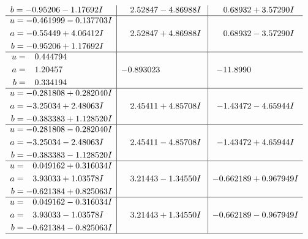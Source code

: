 \documentclass[1p]{elsarticle_modified}
\theoremstyle{definition}
\begin{document}
$$\begin{array}{c|c|c}
\begin{aligned}
b &= -0.95206 - 1.17692 I\end{aligned}
 & \phantom{-}2.52847 - 4.86988 I & \phantom{-}0.68932 + 3.57290 I \\ \hline\begin{aligned}
u &= -0.461999 - 0.137703 I \\
a &= -0.55449 + 4.06412 I \\
b &= -0.95206 + 1.17692 I\end{aligned}
 & \phantom{-}2.52847 + 4.86988 I & \phantom{-}0.68932 - 3.57290 I \\ \hline\begin{aligned}
u &= \phantom{-}0.444794\phantom{ +0.000000I} \\
a &= \phantom{-}1.20457\phantom{ +0.000000I} \\
b &= \phantom{-}0.334194\phantom{ +0.000000I}\end{aligned}
 & -0.893023\phantom{ +0.000000I} & -11.8990\phantom{ +0.000000I} \\ \hline\begin{aligned}
u &= -0.281808 + 0.282040 I \\
a &= -3.25034 + 2.48063 I \\
b &= -0.383383 + 1.128520 I\end{aligned}
 & \phantom{-}2.45411 + 4.85708 I & -1.43472 - 4.65944 I \\ \hline\begin{aligned}
u &= -0.281808 - 0.282040 I \\
a &= -3.25034 - 2.48063 I \\
b &= -0.383383 - 1.128520 I\end{aligned}
 & \phantom{-}2.45411 - 4.85708 I & -1.43472 + 4.65944 I \\ \hline\begin{aligned}
u &= \phantom{-}0.049162 + 0.316034 I \\
a &= \phantom{-}3.93033 + 1.03578 I \\
b &= -0.621384 + 0.825063 I\end{aligned}
 & \phantom{-}3.21443 - 1.34550 I & -0.662189 + 0.967949 I \\ \hline\begin{aligned}
u &= \phantom{-}0.049162 - 0.316034 I \\
a &= \phantom{-}3.93033 - 1.03578 I \\
b &= -0.621384 - 0.825063 I\end{aligned}
 & \phantom{-}3.21443 + 1.34550 I & -0.662189 - 0.967949 I\\
 \hline 
 \end{array}$$\newpage\newpage\renewcommand{\arraystretch}{1}
\end{document}
